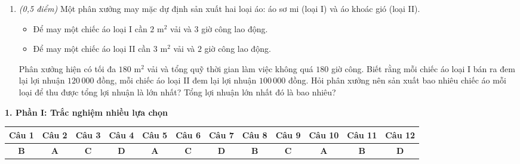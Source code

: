 \documentclass[12pt,a4paper]{article}
\newcommand{\parttitle}[1]{\par\vspace{2pt}{\large\bfseries\color{ink}#1}\par\vspace{1pt}}
\begin{document}
\begin{enumerate}[resume]
\begin{minipage}[t]{0.38\linewidth}
\end{minipage}

\item \textit{(0,5 điểm)} Một phân xưởng may mặc dự định sản xuất hai loại áo: áo sơ mi (loại I) và áo khoác gió (loại II).
\begin{itemize}[leftmargin=0.5cm]
    \item Để may một chiếc áo loại I cần $2\text{ m}^2$ vải và $3$ giờ công lao động.
    \item Để may một chiếc áo loại II cần $3\text{ m}^2$ vải và $2$ giờ công lao động.
\end{itemize}
Phân xưởng hiện có tối đa $180\text{ m}^2$ vải và tổng quỹ thời gian làm việc không quá $180$ giờ công. Biết rằng mỗi chiếc áo loại I bán ra đem lại lợi nhuận $120\,000$ đồng, mỗi chiếc áo loại II đem lại lợi nhuận $100\,000$ đồng. Hỏi phân xưởng nên sản xuất bao nhiêu chiếc áo mỗi loại để thu được tổng lợi nhuận là lớn nhất? Tổng lợi nhuận lớn nhất đó là bao nhiêu?
\end{enumerate}

\newpage
\parttitle{BẢNG ĐÁP ÁN TỔNG HỢP}

\vspace{0.2cm}
\textbf{1. Phần I: Trắc nghiệm nhiều lựa chọn}
\begin{center}
{\setlength{\tabcolsep}{2.5pt}\small
\begin{tabular}{|c|c|c|c|c|c|c|c|c|c|c|c|}
\hline
\textbf{Câu 1} & \textbf{Câu 2} & \textbf{Câu 3} & \textbf{Câu 4} & \textbf{Câu 5} & \textbf{Câu 6} & \textbf{Câu 7} & \textbf{Câu 8} & \textbf{Câu 9} & \textbf{Câu 10} & \textbf{Câu 11} & \textbf{Câu 12} \\
\hline
\textbf{B} & \textbf{A} & \textbf{C} & \textbf{D} & \textbf{A} & \textbf{C} & \textbf{D} & \textbf{B} & \textbf{C} & \textbf{A} & \textbf{B} & \textbf{D} \\
\hline
\end{tabular}}
\end{center}
\end{document}
